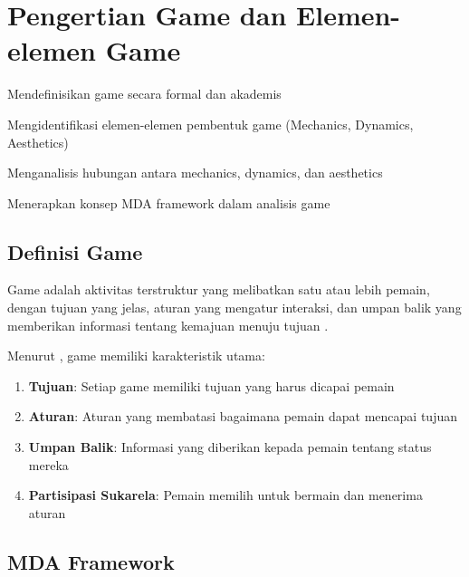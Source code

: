 
\section{Pengertian Game dan Elemen-elemen Game}

\begin{learningoutcomes}
\item Mendefinisikan game secara formal dan akademis
\item Mengidentifikasi elemen-elemen pembentuk game (Mechanics, Dynamics, Aesthetics)
\item Menganalisis hubungan antara mechanics, dynamics, dan aesthetics
\item Menerapkan konsep MDA framework dalam analisis game
\end{learningoutcomes}

\subsection{Definisi Game}

\begin{definisi}[Game]
Game adalah aktivitas terstruktur yang melibatkan satu atau lebih pemain, dengan tujuan yang jelas, aturan yang mengatur interaksi, dan umpan balik yang memberikan informasi tentang kemajuan menuju tujuan \cite{Hunicke2004}.
\end{definisi}

Menurut \cite{Salen2004}, game memiliki karakteristik utama:
\begin{enumerate}
\item \textbf{Tujuan}: Setiap game memiliki tujuan yang harus dicapai pemain
\item \textbf{Aturan}: Aturan yang membatasi bagaimana pemain dapat mencapai tujuan
\item \textbf{Umpan Balik}: Informasi yang diberikan kepada pemain tentang status mereka
\item \textbf{Partisipasi Sukarela}: Pemain memilih untuk bermain dan menerima aturan
\end{enumerate}

\subsection{MDA Framework}

